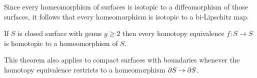 \begin{rem}
  Since every homeomorphism of surfaces is isotopic to a diffeomorphism of those surfaces, it follows that every homeomorphism is isotopic to a bi-Lipschitz map.
\end{rem}
\begin{theorem}\label{thm:homotopy-eq}
  If $S$ is closed surface with genus $g\geq 2$ then every homotopy equivalence $f:S\to S$ is homotopic to a homeomorphism of $S$. 
\end{theorem}
\begin{rem}
This theorem also applies to compact surfaces with boundaries whenever the homotopy equivalence restricts to a homeomorphism $\partial S\to \partial S$.
\end{rem}

